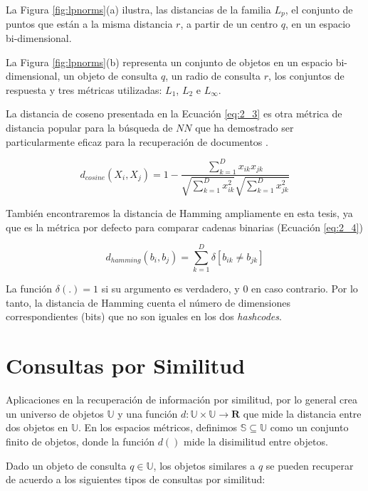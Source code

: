 La Figura \ref{fig:lpnorms}(a)  ilustra,  las distancias de la familia  $L_p$, el conjunto de puntos que están a la misma distancia $r$, a partir de un centro $q$, en un  espacio bi-dimensional.

La Figura \ref{fig:lpnorms}(b) representa un conjunto de objetos en un  espacio bi-dimensional, un objeto de consulta $q$, un radio de consulta $r$, los conjuntos de respuesta y tres métricas utilizadas: $L_1$, $L_2$ e $L_{\infty}$.

La distancia de coseno presentada en la Ecuación \ref{eq:2_3} es otra métrica de distancia popular para la búsqueda de $NN$ que ha demostrado ser particularmente eficaz para la recuperación de documentos \cite{Manning,Ravichandran}.

\begin{equation}\label{eq:2_3}
	    d_{cosine}(X_i,X_j) = 1 - \frac{\sum\nolimits_{k=1}^{D} x_{ik} x_{jk}}{\sqrt{\sum\nolimits_{k=1}^{D} x_{ik}^2}\sqrt{\sum\nolimits_{k=1}^{D} x_{jk}^2}}
\end{equation}

También encontraremos la distancia de Hamming ampliamente en esta tesis, ya que es la métrica por defecto para comparar cadenas binarias (Ecuación \ref{eq:2_4})

\begin{equation}\label{eq:2_4}
	   d_{hamming}(b_i,b_j) = \sum_{k=1}^{D} \delta[b_{ik} \neq b_{jk}]
\end{equation}

La función $\delta(.) = 1$ si su argumento es verdadero, y 0 en caso contrario. Por lo tanto, la distancia de Hamming cuenta el número de dimensiones correspondientes (bits) que no son iguales en los dos \textit{hashcodes}. \\

\section{Consultas por Similitud}\label{sec:consultas-similaridade}

Aplicaciones en la recuperación de información por similitud, por lo general crea un universo de objetos $\mathbb{U}$  y una función $d: \mathbb{U} \times \mathbb{U} \rightarrow \mathbf{R} $ que mide la distancia entre dos objetos en $\mathbb{U} $. En los espacios métricos, definimos $\mathbb{S} \subseteq \mathbb{U} $ como un conjunto finito de objetos, donde la función $d()$ mide la disimilitud entre objetos.

Dado un objeto de consulta $q \in \mathbb{U} $,  los objetos similares a $q$  se pueden recuperar de acuerdo a los siguientes tipos de consultas por similitud:


